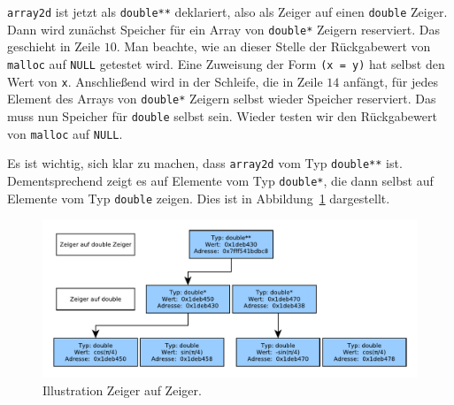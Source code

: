 \verb|array2d| ist jetzt als \verb|double**| deklariert, also als Zeiger auf einen \verb|double| Zeiger. 
Dann wird zunächst Speicher für ein Array von \verb|double*| Zeigern reserviert.
Das geschieht in Zeile $10$.
Man beachte, wie an dieser Stelle der Rückgabewert von \verb|malloc| auf \verb|NULL| getestet wird.
Eine Zuweisung der Form \verb|(x = y)| hat selbst den Wert von \verb|x|.
Anschließend wird in der Schleife, die in Zeile $14$ anfängt, für jedes Element des Arrays von \verb|double*| Zeigern selbst wieder Speicher reserviert.
Das muss nun Speicher für \verb|double| selbst sein.
Wieder testen wir den Rückgabewert von \verb|malloc| auf \verb|NULL|.

Es ist wichtig, sich klar zu machen, dass \verb|array2d| vom Typ \verb|double**| ist.
Dementsprechend zeigt es auf Elemente vom Typ \verb|double*|, die dann selbst auf Elemente vom Typ \verb|double| zeigen.
Dies ist in Abbildung~\ref{fig:mem2d} dargestellt.

\begin{figure}[!ht]
\includegraphics[width=\textwidth]{graphics/zeiger_auf_zeiger}
\caption{Illustration Zeiger auf Zeiger. \label{fig:mem2d}}
\end{figure}

